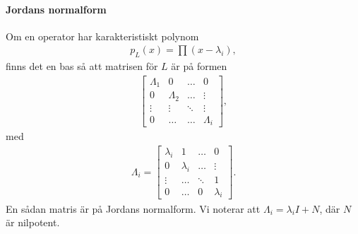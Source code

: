 \paragraph{Jordans normalform}
Om en operator har karakteristiskt polynom
\begin{align*}
	p_{L}(x) = \prod (x - \lambda_{i}),
\end{align*}
finns det en bas så att matrisen för $L$ är på formen
\begin{align*}
	\left[\begin{array}{cccc}
		\Lambda_{1} & 0           & \dots  & 0 \\
		0           & \Lambda_{2} & \dots  & \vdots \\
		\vdots      & \vdots      & \ddots & \vdots \\
		0           & \dots       & \dots  & \Lambda_{i}
	\end{array}\right],
\end{align*}
med 
\begin{align*}
	\Lambda_{i} =
	\left[\begin{array}{cccc}
		\lambda_{i} & 1           & \dots       & 0 \\
		0           & \lambda_{i} & \dots       & \vdots \\
		\vdots      & \dots       & \ddots      & 1 \\
		0           & \dots       & 0           & \lambda_{i}
	\end{array}\right].
\end{align*}
En sådan matris är på Jordans normalform. Vi noterar att $\Lambda_{i} = \lambda_{i}I + N$, där $N$ är nilpotent.

\proof